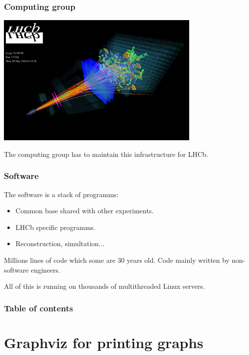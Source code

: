 \documentclass{beamer}
\begin{document}
    \begin{frame}
        \frametitle{Computing group}

        \includegraphics[width=0.75\textwidth]{LHCb_3D.png}

        The computing group has to maintain this infrastructure for LHCb.
    \end{frame}

    \begin{frame}
        \frametitle{Software}

        The software is a stack of programms:

        \begin{itemize}
            \item Common base shared with other experiments.
            \item LHCb specific programms.
            \item Reconstruction, simultation...
        \end{itemize}

        Millions lines of code which some are 30 years old.
        Code mainly written by non-software engineers.

        All of this is running on thousands of multithreaded Linux servers.
    \end{frame}

    \begin{frame}
        \frametitle{Table of contents}
        \tableofcontents
    \end{frame}

\section{Graphviz for printing graphs}

    \begin{frame}
        \tableofcontents[currentsection]
    \end{frame}
\end{document}
